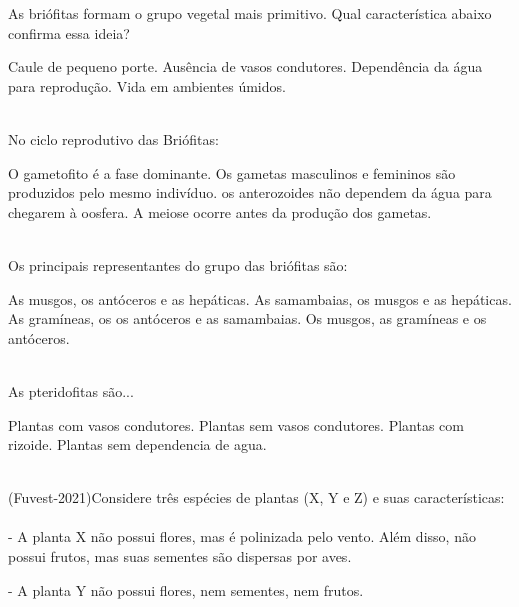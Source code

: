 \documentclass[12pt,a4paper]{exam}
\begin{document}
\begin{questions}

\question As briófitas formam o grupo vegetal mais primitivo. Qual característica abaixo confirma essa ideia?\\
\begin{choices}
    \choice Caule de pequeno porte.
    \choice Ausência de vasos condutores.
    \choice Dependência da água para reprodução.
    \choice Vida em ambientes úmidos.\\\\
\end{choices}

\question No ciclo reprodutivo das Briófitas:\\
\begin{choices}
    \choice O gametofito é a fase dominante.
    \choice Os gametas masculinos e femininos são produzidos pelo mesmo indivíduo.
    \choice os anterozoides não dependem da água para chegarem à oosfera.
    \choice A meiose ocorre antes da produção dos gametas.\\\\
\end{choices}
\question Os principais representantes do grupo das briófitas são:\\
\begin{choices}
    \choice As musgos, os antóceros e as hepáticas.
    \choice As samambaias, os musgos e as hepáticas.
    \choice As gramíneas, os os antóceros e as samambaias.
    \choice Os musgos, as gramíneas e os antóceros.\\\\
\end{choices}
\question As pteridofitas são...\\
\begin{choices}
    \choice Plantas com  vasos condutores.
    \choice Plantas sem vasos condutores.
    \choice Plantas com rizoide.
    \choice Plantas sem dependencia de agua.\\\\
\end{choices}

\question (Fuvest-2021)Considere três espécies de plantas (X, Y e Z) e suas características:\\\\
- A planta X não possui flores, mas é polinizada pelo vento. Além disso, não possui frutos, mas suas sementes são dispersas por aves.

- A planta Y não possui flores, nem sementes, nem frutos.


\end{questions}
\end{document}
